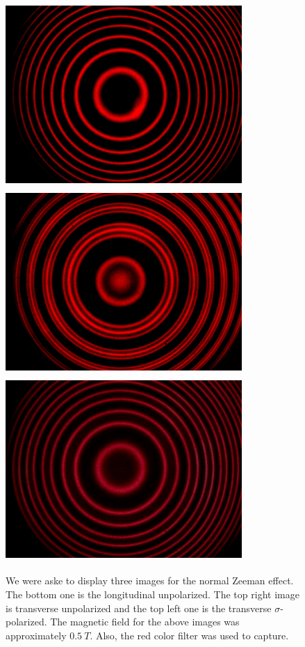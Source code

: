 \documentclass[fleqn]{article}
\begin{document}
  \begin{figure}[h!]
    \includegraphics[height=7cm, width=9cm]{Second.jpg}
    \includegraphics[height=7cm, width=9cm]{First.jpg}
    \includegraphics[height=7cm, width=9cm]{Third.jpg}
    \caption{
      We were aske to display three images for the normal Zeeman effect. The bottom one is 
      the longitudinal unpolarized. The top right image is transverse unpolarized and the top left one 
      is the transverse $\sigma$-polarized. The magnetic field for the above images was approximately $0.5 ~ T$. Also, 
      the red color filter was used to capture.
    }
  \end{figure}
\end{document}

